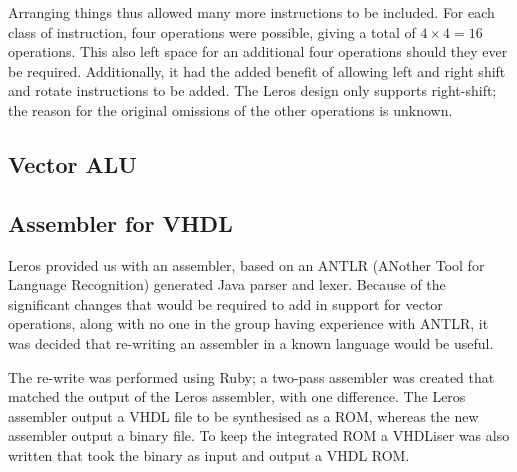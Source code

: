 Arranging things thus allowed many more instructions to be included. For each
class of instruction, four operations were possible, giving a total of $4 \times
4 = 16$ operations. This also left space for an additional four operations
should they ever be required. Additionally, it  had the added benefit of
allowing left and right shift and rotate instructions to be added. The Leros
design only supports right-shift; the reason for the original omissions of the other
operations is unknown.



\subsection{Vector ALU}


\subsection{Assembler for VHDL}

  Leros provided us with an assembler, based on an ANTLR (ANother Tool for
  Language Recognition) generated Java parser and lexer.  Because of the
  significant changes that would be required to add in support for vector
  operations, along with no one in the group having experience with ANTLR, it
  was decided that re-writing an assembler in a known language would be useful.

  The re-write was performed using Ruby; a two-pass assembler was created that
  matched the output of the Leros assembler, with one difference.  The
  Leros assembler output a VHDL file to be synthesised as a ROM, whereas the new assembler
  output a binary file.  To keep the integrated ROM a VHDLiser was also written
  that took the binary as input and output a VHDL ROM.
